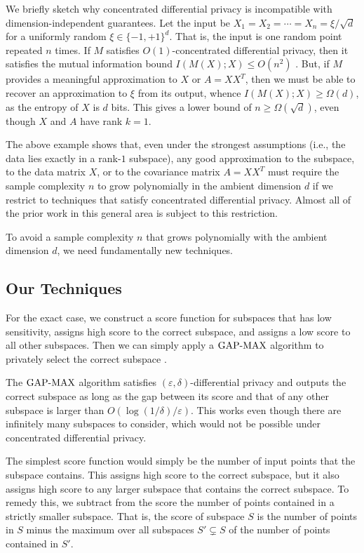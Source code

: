 We briefly sketch why concentrated differential privacy is incompatible with dimension-independent guarantees. Let the input be $X_1 = X_2 = \cdots = X_n = \xi/\sqrt{d}$ for a uniformly random $\xi \in \{-1,+1\}^d$. That is, the input is one random point repeated $n$ times. If $M$ satisfies $O(1)$-concentrated differential privacy, then it satisfies the mutual information bound $I(M(X);X) \le O(n^2)$ \cite{BunS16}. But, if $M$ provides a meaningful approximation to $X$ or $A = XX^T$, then we must be able to recover an approximation to $\xi$ from its output, whence $I(M(X);X) \ge \Omega(d)$, as the entropy of $X$ is $d$ bits. This gives a lower bound of $n \ge \Omega(\sqrt{d})$, even though $X$ and $A$ have rank $k=1$.

The above example shows that, even under the strongest assumptions (i.e., the data lies exactly in a rank-$1$ subspace), any good approximation to the subspace, to the data matrix $X$, or to the covariance matrix $A = XX^T$ must require the sample complexity $n$ to grow polynomially in the ambient dimension $d$ if we restrict to techniques that satisfy concentrated differential privacy. Almost all of the prior work in this general area is subject to this restriction.

To avoid a sample complexity $n$ that grows polynomially with the ambient dimension $d$, we need fundamentally new techniques.

\subsection{Our Techniques}

For the exact case, we construct a score function for subspaces that has low sensitivity, assigns high score to the correct subspace, and assigns a low score to all other subspaces. Then we can simply apply a $\mathrm{GAP\text{-}MAX}$ algorithm to privately select the correct subspace \cite{BunDRS18}. 

The $\mathrm{GAP\text{-}MAX}$ algorithm satisfies $(\varepsilon,\delta)$-differential privacy and outputs the correct subspace as long as the gap between its score and that of any other subspace is larger than $O(\log(1/\delta)/\varepsilon)$. This works even though there are infinitely many subspaces to consider, which would not be possible under concentrated differential privacy. 

The simplest score function would simply be the number of input points that the subspace contains. This assigns high score to the correct subspace, but it also assigns high score to any larger subspace that contains the correct subspace. To remedy this, we subtract from the score the number of points contained in a strictly smaller subspace. That is, the score of subspace $S$ is the number of points in $S$ minus the maximum over all subspaces $S' \subsetneq S$ of the number of points contained in $S'$.

